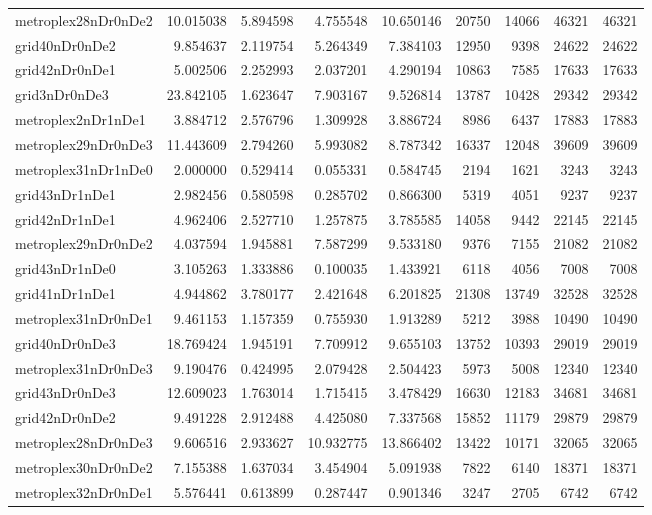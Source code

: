 \begin{longtable}{|l|r|r|r|r|r|r|r|r|}
metroplex28nDr0nDe2 & 10.015038 & 5.894598 & 4.755548 & 10.650146 & 20750 & 14066 & 46321 & 46321 \\
grid40nDr0nDe2 & 9.854637 & 2.119754 & 5.264349 & 7.384103 & 12950 & 9398 & 24622 & 24622 \\
grid42nDr0nDe1 & 5.002506 & 2.252993 & 2.037201 & 4.290194 & 10863 & 7585 & 17633 & 17633 \\
grid3nDr0nDe3 & 23.842105 & 1.623647 & 7.903167 & 9.526814 & 13787 & 10428 & 29342 & 29342 \\
metroplex2nDr1nDe1 & 3.884712 & 2.576796 & 1.309928 & 3.886724 & 8986 & 6437 & 17883 & 17883 \\
metroplex29nDr0nDe3 & 11.443609 & 2.794260 & 5.993082 & 8.787342 & 16337 & 12048 & 39609 & 39609 \\
metroplex31nDr1nDe0 & 2.000000 & 0.529414 & 0.055331 & 0.584745 & 2194 & 1621 & 3243 & 3243 \\
grid43nDr1nDe1 & 2.982456 & 0.580598 & 0.285702 & 0.866300 & 5319 & 4051 & 9237 & 9237 \\
grid42nDr1nDe1 & 4.962406 & 2.527710 & 1.257875 & 3.785585 & 14058 & 9442 & 22145 & 22145 \\
metroplex29nDr0nDe2 & 4.037594 & 1.945881 & 7.587299 & 9.533180 & 9376 & 7155 & 21082 & 21082 \\
grid43nDr1nDe0 & 3.105263 & 1.333886 & 0.100035 & 1.433921 & 6118 & 4056 & 7008 & 7008 \\
grid41nDr1nDe1 & 4.944862 & 3.780177 & 2.421648 & 6.201825 & 21308 & 13749 & 32528 & 32528 \\
metroplex31nDr0nDe1 & 9.461153 & 1.157359 & 0.755930 & 1.913289 & 5212 & 3988 & 10490 & 10490 \\
grid40nDr0nDe3 & 18.769424 & 1.945191 & 7.709912 & 9.655103 & 13752 & 10393 & 29019 & 29019 \\
metroplex31nDr0nDe3 & 9.190476 & 0.424995 & 2.079428 & 2.504423 & 5973 & 5008 & 12340 & 12340 \\
grid43nDr0nDe3 & 12.609023 & 1.763014 & 1.715415 & 3.478429 & 16630 & 12183 & 34681 & 34681 \\
grid42nDr0nDe2 & 9.491228 & 2.912488 & 4.425080 & 7.337568 & 15852 & 11179 & 29879 & 29879 \\
metroplex28nDr0nDe3 & 9.606516 & 2.933627 & 10.932775 & 13.866402 & 13422 & 10171 & 32065 & 32065 \\
metroplex30nDr0nDe2 & 7.155388 & 1.637034 & 3.454904 & 5.091938 & 7822 & 6140 & 18371 & 18371 \\
metroplex32nDr0nDe1 & 5.576441 & 0.613899 & 0.287447 & 0.901346 & 3247 & 2705 & 6742 & 6742 \\

\end{longtable}
